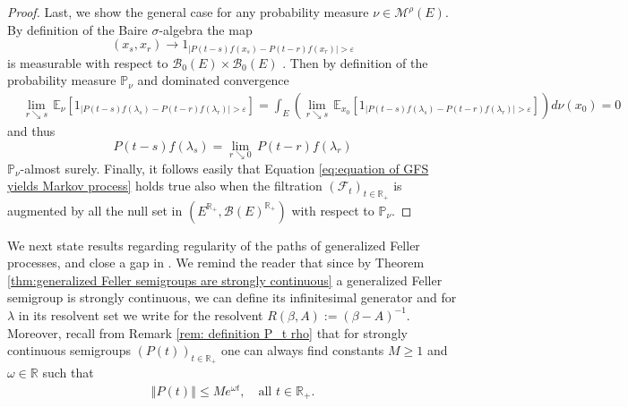 \documentclass[a4paper,12pt]{article}
\theoremstyle{definition}
\theoremstyle{remark}
\numberwithin{equation}{section}
\numberwithin{theorem}{section}
\begin{document}
\begin{proof}
Last, we show the general case for any  probability measure  $\nu\in\mathcal{M}^{\rho}(E)$. By definition of the Baire $\sigma$-algebra the map 
\[
(x_s,x_r)\rightarrow1_{\left|P\left(t-s\right)f(x_{s})-P\left(t-r\right)f(x_{r})\right|>\varepsilon}
\]
 is measurable with respect to $\mathcal{B}_{0}(E)\times \mathcal{B}_{0}(E)$ . Then by definition of the probability measure $\mathbb{P}_{\nu}$ and dominated convergence 
\begin{align*}
 & \underset{r\searrow s}{\lim}\,\mathbb{E}_{\nu}\left[1_{\left|P\left(t-s\right)f(\lambda_{s})-P\left(t-r\right)f(\lambda_{r})\right|>\varepsilon}\right]=\int_{E}\left(\underset{r\searrow s}{\lim}\,\mathbb{E}_{x_{0}}\left[1_{\left|P\left(t -s\right)f(\lambda_{s})-P\left(t-r\right)f(\lambda_{r})\right|>\varepsilon}\right]\right)d\nu(x_{0}) =0
\end{align*}
and thus
\[
P\left(t-s\right)f(\lambda_{s})=\underset{r\searrow0}{\lim}\,P\left(t-r\right)f(\lambda_{r})
\]
$
\mathbb{P}_{\nu}$-almost
surely. 
Finally, it follows easily that Equation \eqref{eq:equation of GFS yields Markov process} holds true also when the filtration
$
\left(\mathcal{F}_{t}\right)_{t\in\mathbb{R}_{+}}
$
is augmented by all the null set in  
$
\left(E^{\mathbb{R}_{+}},\mathcal{B}(E)^{\mathbb{R}_{+}}\right)
$
with respect to $\mathbb{P}_{\nu}$.
\end{proof}





We next state results regarding regularity of the paths of generalized
Feller processes, and close a gap in \cite{CuT}. We remind the reader that since by Theorem \ref{thm:generalized Feller semigroups are strongly continuous}
a generalized Feller semigroup is strongly continuous, we can define its infinitesimal
generator and for $\lambda$ in its resolvent set we write for the resolvent $R(\beta,A):=(\beta-A)^{-1}$. Moreover, recall from Remark \ref{rem: definition P_t rho}
that for strongly continuous semigroups $(P(t))_{t \in \mathbb{R}_+}$ one can always find constants $M\geq1$ and $\omega\in\mathbb{R}$ such that
\begin{align}\label{eq:Momega}
\left\Vert P(t)\right\Vert \leq Me^{\omega t},  \quad \text{all } t\in\mathbb{R}_{+}.
\end{align} 
\end{document}

